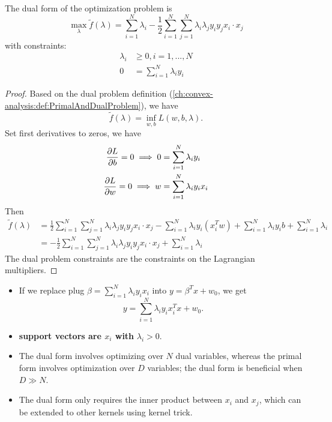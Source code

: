 \begin{refsection}
\begin{theorem}
	The dual form of the optimization problem is
	$$\max_{\lambda} \tilde{f}(\lambda) = \sum_{i=1}^N \lambda_i - \frac{1}{2}\sum_{i=1}^N\sum_{j=1}^N \lambda_i\lambda_j y_iy_j x_i\cdot x_j$$
	with constraints:
	\begin{align*}
	\lambda_i &\geq 0, i = 1,...,N\\
	0 &= \sum_{i=1}^N \lambda_iy_i
	\end{align*}
\end{theorem}
\begin{proof}
	Based on the dual problem definition (\autoref{ch:convex-analysis:def:PrimalAndDualProblem}), we have
	$$\tilde{f}(\lambda) = \inf_{w,b} L(w,b,\lambda).$$
	Set first derivatives to zeros, we have
	\begin{align*}
	\frac{\partial L}{\partial b} = 0 \implies 0 &= \sum_{i=1}^N \lambda_iy_i\\
	\frac{\partial L}{\partial w} = 0 \implies w &= \sum_{i=1}^N \lambda_iy_ix_i
	\end{align*}
	Then
	\begin{align*}
	\tilde{f}(\lambda) &=\frac{1}{2}\sum_{i=1}^N\sum_{j=1}^N \lambda_i\lambda_j y_iy_j x_i\cdot x_j - \sum_{i=1}^N \lambda_i y_i(x_i^Tw)  + \sum_{i=1}^N \lambda_iy_ib + \sum_{i=1}^N \lambda_i\\
	&= -\frac{1}{2}\sum_{i=1}^N\sum_{j=1}^N \lambda_i\lambda_j y_iy_j x_i\cdot x_j + \sum_{i=1}^N \lambda_i
	\end{align*}
	The dual problem constraints are the constraints on the Lagrangian multipliers. 
\end{proof}


\begin{remark}
	\begin{itemize}
		\item If we replace plug $\beta = \sum_{i=1}^N \lambda_iy_ix_i$ into $y = \beta^Tx + w_0$, we get
		$$y = \sum_{i=1}^N \lambda_i y_ix_i^T x + w_0.$$
		\item \textbf{support vectors are $x_i$ with} $\lambda_i > 0$.
	\end{itemize}
\end{remark}



\begin{remark}\hfill
	\begin{itemize}
		\item The dual form involves optimizing over $N$ dual variables, whereas the primal form involves optimization over $D$ variables; the dual form is beneficial when $D\gg N$.
		\item The dual form only requires the inner product between $x_i$ and $x_j$, which can be extended to other kernels using kernel trick.
	\end{itemize}	
\end{remark}


\end{refsection}
